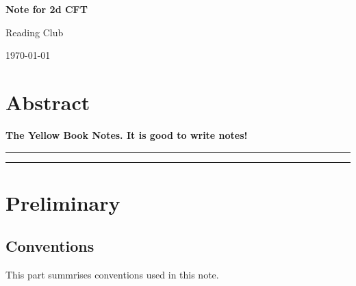 \documentclass[submission, PhysLectNotes]{SciPost}
\begin{document}
\begin{center}{\Large \textbf{
Note for 2d CFT\\
}}\end{center}

\begin{center}
Reading Club%
\end{center}

\begin{center}
\end{center}

\begin{center}
\today
\end{center}


\section*{Abstract}
{\bf
The Yellow Book Notes. It is good to write notes!
}


\vspace{10pt}
\noindent\rule{\textwidth}{1pt}
\tableofcontents\thispagestyle{fancy}
\noindent\rule{\textwidth}{1pt}
\vspace{10pt}


\section{Preliminary}
\subsection{Conventions}
This part summrises conventions used in this note. 
\end{document}
